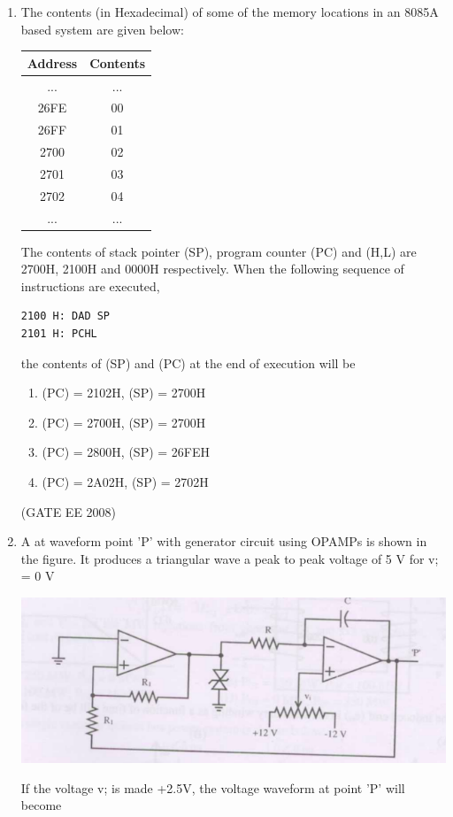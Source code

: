 \documentclass[journal,12pt,onecolumn]{IEEEtran}
\theoremstyle{remark}
\begin{document}
\begin{enumerate}[start=1, label=Q.\arabic*]
\item 
The contents (in Hexadecimal) of some of the memory locations in an 8085A based system are given below:

\begin{center}
\begin{tabular}{|c|c|}
\hline
Address & Contents \\
\hline
... & ... \\
\hline
26FE & 00 \\
\hline
26FF & 01 \\
\hline
2700 & 02 \\
\hline
2701 & 03 \\
\hline
2702 & 04 \\
\hline
... & ... \\
\hline
\end{tabular}
\end{center}

The contents of stack pointer (SP), program counter (PC) and (H,L) are 2700H, 2100H and 0000H respectively. When the following sequence of instructions are executed,
\vspace{0.5em}
\begin{verbatim}
2100 H: DAD SP
2101 H: PCHL
\end{verbatim}
\vspace{0.5em}
the contents of (SP) and (PC) at the end of execution will be

\begin{multicols}{2}
\begin{enumerate}
    \item (PC) = 2102H, (SP) = 2700H
    \item (PC) = 2700H, (SP) = 2700H
    \item (PC) = 2800H, (SP) = 26FEH
    \item (PC) = 2A02H, (SP) = 2702H
\end{enumerate}
\end{multicols}
\hfill (GATE EE 2008)


\item  A
at waveform point 'P' with generator circuit using OPAMPs is shown in the figure. It produces a triangular wave a peak to peak voltage of 5 V for v; = 0 V

\begin{center}
    \includegraphics[width=\columnwidth]{Fig/q46.png}
    \caption{}
\end{center}
If the voltage v; is made +2.5V, the voltage waveform at point 'P' will become
\begin{enumerate}
        

\end{enumerate}
\end{enumerate}
\end{document}
